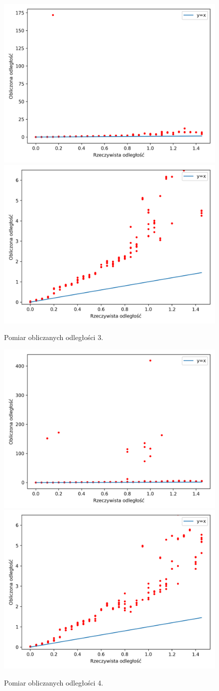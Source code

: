 \begin{figure}[h]
\centering
    \includegraphics[width=.49\textwidth]{pics/mic_sync_dist/dists_long_2.png}
    \includegraphics[width=.49\textwidth]{pics/mic_sync_dist/dists_close_long_2.png}
\caption{Pomiar obliczanych odległości 3.}
\label{pic:slope_test_2}
\end{figure}

\begin{figure}[h]
\centering
    \includegraphics[width=.49\textwidth]{pics/mic_sync_dist/dists_long_3.png}
    \includegraphics[width=.49\textwidth]{pics/mic_sync_dist/dists_close_long_3.png}
\caption{Pomiar obliczanych odległości 4.}
\label{pic:slope_test_3}
\end{figure}


